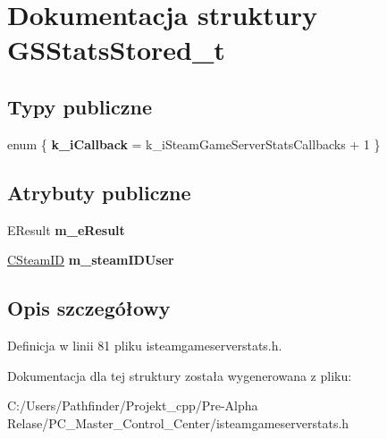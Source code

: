 \hypertarget{struct_g_s_stats_stored__t}{}\section{Dokumentacja struktury G\+S\+Stats\+Stored\+\_\+t}
\label{struct_g_s_stats_stored__t}
\subsection*{Typy publiczne}
\begin{DoxyCompactItemize}
\item 
\mbox{\label{struct_g_s_stats_stored__t_a8182ff734fd482efd0b47218ad5f70b4}} 
enum \{ {\bfseries k\+\_\+i\+Callback} = k\+\_\+i\+Steam\+Game\+Server\+Stats\+Callbacks + 1
 \}
\end{DoxyCompactItemize}
\subsection*{Atrybuty publiczne}
\begin{DoxyCompactItemize}
\item 
\mbox{\label{struct_g_s_stats_stored__t_a11fe06b488dd6a220008e3a1461d4059}} 
E\+Result {\bfseries m\+\_\+e\+Result}
\item 
\mbox{\label{struct_g_s_stats_stored__t_a4db07b257b9a6ebb0695c12d42f307d5}} 
\hyperlink{class_c_steam_i_d}{C\+Steam\+ID} {\bfseries m\+\_\+steam\+I\+D\+User}
\end{DoxyCompactItemize}


\subsection{Opis szczegółowy}


Definicja w linii 81 pliku isteamgameserverstats.\+h.



Dokumentacja dla tej struktury została wygenerowana z pliku\+:\begin{DoxyCompactItemize}
\item 
C\+:/\+Users/\+Pathfinder/\+Projekt\+\_\+cpp/\+Pre-\/\+Alpha Relase/\+P\+C\+\_\+\+Master\+\_\+\+Control\+\_\+\+Center/isteamgameserverstats.\+h\end{DoxyCompactItemize}
